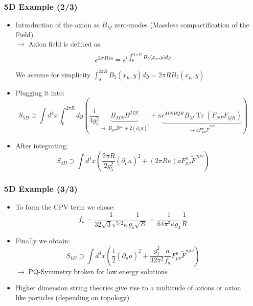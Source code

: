 \documentclass[aspectratio=1610, 9pt]{beamer}
\DeclareMathOperator{\Tr}{Tr}
\begin{document}
\begin{frame}
	\frametitle{5D Example (2/3)}
		\begin{itemize}
			\item Introduction of the axion as $B_M$ zero-modes (Massless compactification of the Field)\\
			$\rightarrow$ Axion field is defined as: 
			\begin{equation*}
				{\Large e^{2\pi R i a} \equiv e^{i\int_{0}^{2\pi R}B_5(x_\mu, y)dy}}
			\end{equation*}
			We assume for simplicity $\int_{0}^{2\pi R}B_5(x_\mu, y)dy = 2\pi RB_5(x_\mu, y)$
			\item Plugging it into:
			\begin{equation*}
				S_{5D} \supset \int d^4x \int_0^{2\pi R} dy \left( \frac{1}{4 g_5^2} \underbrace{B_{MN} B^{MN}}_{\rightarrow\ B_{\mu\nu}B^{\mu\nu} + 2(\partial_\mu a)^2} + \kappa \underbrace{\epsilon^{MNPQR} B_M \Tr(F_{NP} F_{QR})}_{\rightarrow aF_{\mu\nu}^a \tilde{F}^{a\mu\nu}} \right)
			\end{equation*}
			\item After integrating:
			\begin{equation*}
				S_{4D} \supset \int d^4x \left( \frac{2\pi R}{2g_5^2} (\partial_\mu a)^2 + (2\pi R \kappa) a F_{\mu\nu}^a \tilde{F}^{a\mu\nu} \right)
			\end{equation*}
		\end{itemize}
\end{frame}

\begin{frame}
	\frametitle{5D Example (3/3)}
	\begin{itemize}
		\item To form the CPV term we chose:
		\begin{equation*}
			f_a = \frac{1}{32 \sqrt{3} \pi^{5/2} \kappa} \frac{1}{g_5 \sqrt{R}} = \frac{1}{64 \pi^3 \kappa g_4} \frac{1}{R}
		\end{equation*}
		\item Finally we obtain:
		\begin{equation*}
			S_{4D} \supset \int d^4x \left( \frac{1}{2} (\partial_\mu a)^2 + \frac{g_f^2}{32 \pi^2} \frac{a}{f_a} F_{\mu\nu}^a \tilde{F}^{a\mu\nu} \right)
		\end{equation*}
		$\rightarrow$ PQ-Symmetry broken for low energy solutions
    \item Higher dimension string theories give rise to a multitude of axions or axion like particles (depending on topology)
	\end{itemize}
\end{frame}
\end{document}
